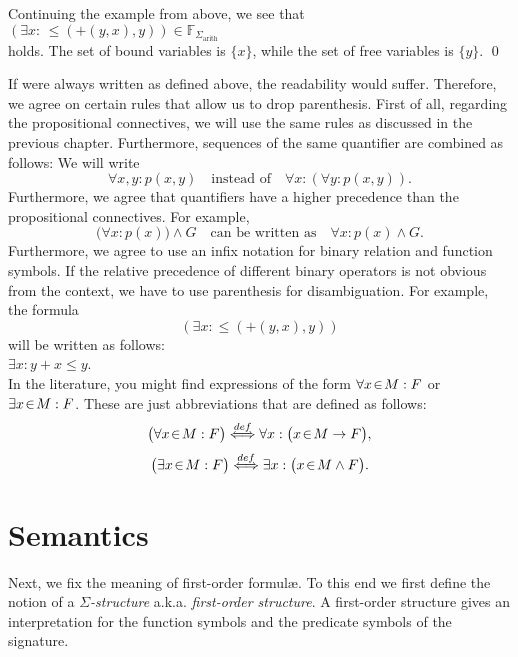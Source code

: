 \example
Continuing the example from above, we see that \\[0.2cm]
\hspace*{1.3cm} 
$(\exists x \colon\, \leq\!(\mathtt{+}(y, x),y)) \in \mathbb{F}_{\Sigma_{\mathrm{arith}}}$ 
\\[0.2cm]
holds.  The set of bound variables is  $\{x\}$, while the set of free variables is $\{ y \}$. \qed
\vspace{0.3cm}

If \formulae were always written as defined above, the readability would suffer.
Therefore, we agree on certain rules that allow us to drop parenthesis.  First of all, 
regarding the propositional connectives, we will use the same rules as discussed in the previous
chapter.  Furthermore, sequences of the same quantifier are combined as follows:
We will write  
\[ 
\forall x, y \colon p(x, y)  \quad \mbox{instead of} \quad \forall x \colon ( \forall y \colon p(x,y)). 
\]
Furthermore, we agree that quantifiers have a higher precedence than the propositional connectives.
For example, 
\[ \bigl(\forall x \colon p(x)\bigr) \wedge G  \quad \mbox{can be written as} 
   \quad \forall x \colon p(x) \wedge G.  
\]
Furthermore, we agree to use an infix notation for binary relation and function symbols.
If the relative precedence of different binary operators is not obvious from the context, we have to
use parenthesis for disambiguation.
For example, the formula
\[ (\exists x \colon \leq(\mathtt{+}(y, x),y)) \]
will be written as follows: \\[0.2cm]
\hspace*{1.3cm} $\exists x \colon y + x \leq y$. 
\\[0.2cm]
In the literature, you might find expressions of the form 
$\forall x\!\in\! M: F$ or $\exists x\!\in\! M: F$.  These are just abbreviations that are defined as follows:
\[ \bigl(\forall x\!\in\! M: F\bigr) \stackrel{def}{\Longleftrightarrow} \forall x: \bigl(x \!\in\! M \rightarrow F\bigr),\]
\[ \bigl(\exists x\!\in\! M: F\bigr) \stackrel{def}{\Longleftrightarrow} \exists x: \bigl(x \!\in\! M \wedge F\bigr).\]

\section{Semantics \label{sec:semantics}}
Next, we fix the meaning of first-order formul\ae.   To this end we first define the notion of 
a \emph{$\Sigma$-structure} a.k.a. \emph{first-order structure}.  
A first-order structure gives an interpretation for the function symbols and the predicate symbols
of the signature.

